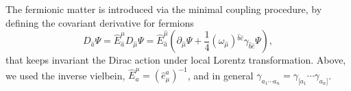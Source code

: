 \documentclass[twocolumn,showpacs,showkeys,prd,superscriptaddress]{revtex4-1}
\begin{document}
The fermionic matter is introduced via the minimal coupling procedure, by  defining the covariant derivative for fermions
\begin{equation}
  \label{covder}
  D_{\hat{a}}\Psi = \hat{E}_{\hat{a}}^{\hat{\mu}}D_{\hat{\mu}}\Psi = \hat{E}_{\hat{a}}^{\hat{\mu}}\left(\partial_{\hat{\mu}}\Psi + \frac{1}{4}(\hat{\omega}_{\hat{\mu}}){}^{\hat{b}\hat{c}}\gamma_{\hat{b}\hat{c}}\Psi\right),
\end{equation}
that keeps invariant the Dirac action under local Lorentz transformation. Above, we used the inverse vielbein, $\hat{E}^\mu_a = \left(\hat{e}^a_\mu\right)^{-1}$, and in general $\gamma_{a_1 \cdots a_n} = \gamma_{[a_1}\cdots\gamma_{a_n]}$.
\end{document}
